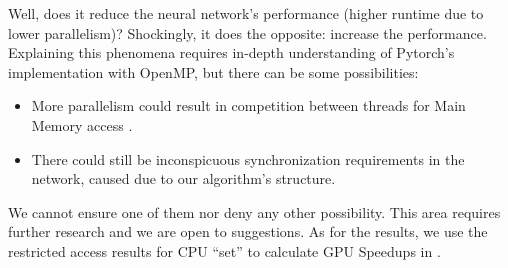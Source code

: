Well, does it reduce the neural network's performance (higher runtime due to lower parallelism)? Shockingly, it does the opposite: increase the performance. Explaining this phenomena requires in-depth understanding of Pytorch's implementation with OpenMP, but there can be some possibilities:
\begin{itemize}
    \item More parallelism could result in competition between threads for Main Memory access \cite[Section 2.1]{IssuesMP}.
    \item There could still be inconspicuous synchronization requirements in the network, caused due to our algorithm's structure.
\end{itemize}
We cannot ensure one of them nor deny any other possibility. This area requires further research and we are open to suggestions. As for the results, we use the restricted access results for CPU ``set'' to calculate GPU Speedups in .